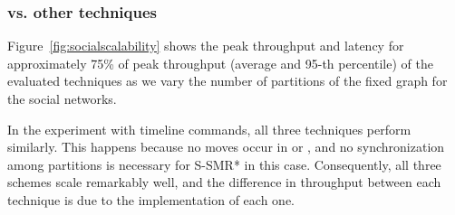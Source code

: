 

\subsubsection{\dynastar vs. other techniques}
\label{sec:dynastar-evaluation:results}

Figure~\ref{fig:socialscalability} shows the peak throughput and latency for approximately 75\% of peak throughput
 (average and 95-th percentile) of the evaluated techniques as we vary the number of
 partitions of the fixed graph for the social networks.

In the experiment with timeline commands, all three techniques perform similarly. This happens because no moves occur in
\dynastar or \dssmr{}, and no synchronization among partitions is necessary for S-SMR* in this case.
Consequently, all three schemes scale remarkably well, and
the difference in throughput between each technique is due to the implementation of each one.


